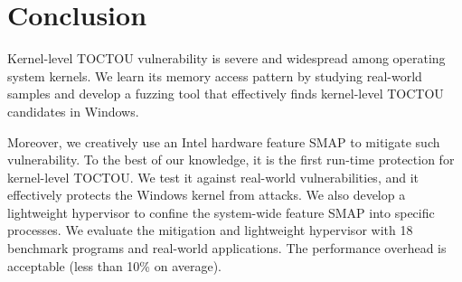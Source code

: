 \section{Conclusion}
\label{sec:ktoctou-conclusion}


Kernel-level TOCTOU vulnerability is severe and widespread among operating system kernels. We learn its memory access pattern by studying real-world samples and develop a fuzzing tool that
effectively finds kernel-level TOCTOU candidates in Windows.

Moreover, we creatively use an Intel hardware feature SMAP to mitigate such vulnerability. To the best of our knowledge, it is the first run-time protection for kernel-level TOCTOU. We test it against real-world vulnerabilities, and it effectively protects the Windows kernel from attacks. We also develop a lightweight hypervisor to confine the system-wide feature SMAP into specific processes. We evaluate the mitigation and lightweight hypervisor with 18 benchmark programs and real-world applications. The performance overhead is acceptable (less than 10\% on average).
